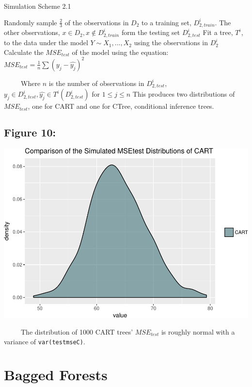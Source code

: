 \documentclass[12pt,twoside]{reedthesis}
\begin{document}
  \begin{algorithm}
  \caption{Simulation Scheme 2.1}
  \label{sim2.1}
  \begin{algorithmic}[1]
  \State Randomly sample $\frac 2 3$  of the observations in  $D_2$  to a training set,  $D_{2, train}^i$. The other observations,  $x \in D_2, x \notin D_{2, train}^i$ form the testing set $D_{2, test}^i$
  \State Fit a tree, $T^i$, to the data under the model $Y \sim X_1,...,X_2$ using the observations in      $D_{2}^i$
  \State Calculate the $MSE_{test}$ of the model using the equation:
      $MSE_{test} = \frac 1 n \sum (y_j - \hat{y_j})^2$
  \EndFor
  \end{algorithmic}
  \end{algorithm}
  
  ~~~~~Where \(n\) is the number of observations in \(D_{2, test}^i\),
  \(y_j \in D_{2, test}^i, \hat{y_j} \in T^i(D_{2, test}^i)\) for
  \(1 \leq j \leq n\) This produces two distributions of \(MSE_{test}\),
  one for CART and one for CTree, conditional inference trees.
  
  \subsection{Figure 10:}\label{figure-10}
  
  \includegraphics{Thesis_files/figure-latex/fig10-1.pdf}
  
  ~~~~~The distribution of 1000 CART trees' \(MSE_{test}\) is roughly
  normal with a variance of \texttt{var(testmseC)}.
  
  \section{Bagged Forests}\label{bagged-forests}
  
\end{document}
